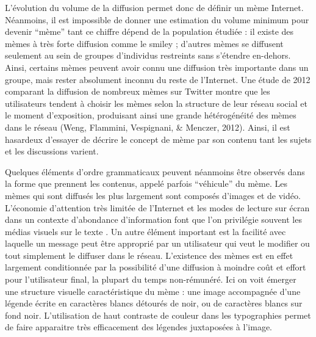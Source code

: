 L{\textquoteright}\'evolution du volume de la diffusion permet donc de d\'efinir un m\`eme Internet. N\'eanmoins, il est impossible de donner une estimation du volume minimum pour devenir {\textquotedblleft}m\`eme{\textquotedblright} tant ce chiffre d\'epend de la population \'etudi\'ee : il existe des m\`emes \`a tr\`es forte diffusion comme le smiley ; d{\textquoteright}autres m\`emes se diffusent seulement au sein de groupes d{\textquoteright}individus restreints sans s{\textquoteright}\'etendre en-dehors. Ainsi, certains m\`emes peuvent avoir connu une diffusion tr\`es importante dans un groupe, mais rester absolument inconnu du reste de l{\textquoteright}Internet. Une \'etude de 2012 comparant la diffusion de nombreux m\`emes sur Twitter montre que les utilisateurs tendent \`a choisir les m\`emes selon la structure de leur r\'eseau social et le moment d{\textquoteright}exposition, produisant ainsi une grande h\'et\'erog\'en\'eit\'e des m\`emes dans le r\'eseau (Weng, Flammini, Vespignani, \& Menczer, 2012). Ainsi, il est hasardeux d{\textquoteright}essayer de d\'ecrire le concept de m\`eme par son contenu tant les sujets et les discussions varient. 

Quelques \'el\'ements d{\textquoteright}ordre grammaticaux peuvent n\'eanmoins \^etre observ\'es dans la forme que prennent les contenus, appel\'e parfois {\textquotedblleft}v\'ehicule{\textquotedblright} du m\`eme. Les m\`emes qui sont diffus\'es les plus largement sont compos\'es d{\textquoteright}images et de vid\'eo. L{\textquoteright}\'economie d{\textquoteright}attention tr\`es limit\'ee de l{\textquoteright}Internet et les modes de lecture sur \'ecran dans un contexte d{\textquoteright}abondance d{\textquoteright}information font que l{\textquoteright}on privil\'egie souvent les m\'edias visuels sur le texte \citep{Goldhaber2006}. Un autre \'el\'ement important est la facilit\'e avec laquelle un message peut \^etre appropri\'e par un utilisateur qui veut le modifier ou tout simplement le diffuser dans le r\'eseau. L{\textquoteright}existence des m\`emes est en effet largement conditionn\'ee par la possibilit\'e d{\textquoteright}une diffusion \`a moindre co\^ut et effort pour l{\textquoteright}utilisateur final, la plupart du temps non-r\'emun\'er\'e. Ici on voit \'emerger une structure visuelle caract\'eristique du m\`eme : une image accompagn\'ee d{\textquoteright}une l\'egende \'ecrite en caract\`eres blancs d\'etour\'es de noir, ou de caract\`eres blancs sur fond noir. L{\textquoteright}utilisation de haut contraste de couleur dans les typographies permet de faire apparaitre tr\`es efficacement des l\'egendes juxtapos\'ees \`a l{\textquoteright}image.


